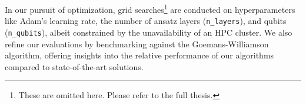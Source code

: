 In our pursuit of optimization, grid searches\footnote{These are omitted here. Please refer to the full thesis.} are conducted on hyperparameters like Adam's learning rate, the number of ansatz layers (\texttt{n\_layers}), and qubits (\texttt{n\_qubits}), albeit constrained by the unavailability of an HPC cluster. We also refine our evaluations by benchmarking against the Goemans-Williamson algorithm, offering insights into the relative performance of our algorithms compared to state-of-the-art solutions. %